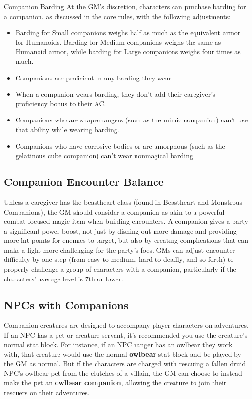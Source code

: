 \documentclass[10pt,a4paper,twoside,bg=print,twocolumn,openany,nodeprecatedcode]{dndbook}
\begin{document}
\begin{DndSidebar}[float=!b]{Companion Barding}
At the GM's discretion, characters can purchase barding for a companion, as discussed in the core rules, with the following adjustments:




\begin{itemize}
\item Barding for Small companions weighs half as much as the equivalent armor for Humanoids. Barding for Medium companions weighs the same as Humanoid armor, while barding for Large companions weighs four times as much.
\item Companions are proficient in any barding they wear.
\item When a companion wears barding, they don't add their caregiver's proficiency bonus to their AC.
\item Companions who are shapechangers (such as the mimic companion) can't use that ability while wearing barding.
\item Companions who have corrosive bodies or are amorphous (such as the gelatinous cube companion) can't wear nonmagical barding.
\end{itemize}



\end{DndSidebar}

\subsection{Companion Encounter Balance}
Unless a caregiver has the beastheart class (found in Beastheart and Monstrous Companions), the GM should consider a companion as akin to a powerful combat-focused magic item when building encounters. A companion gives a party a significant power boost, not just by dishing out more damage and providing more hit points for enemies to target, but also by creating complications that can make a fight more challenging for the party's foes. GMs can adjust encounter difficulty by one step (from easy to medium, hard to deadly, and so forth) to properly challenge a group of characters with a companion, particularly if the characters' average level is 7th or lower.

\subsection{NPCs with Companions}
Companion creatures are designed to accompany player characters on adventures. If an NPC has a pet or creature servant, it's recommended you use the creature's normal stat block. For instance, if an NPC ranger has an owlbear they work with, that creature would use the normal \textbf{owlbear} stat block and be played by the GM as normal. But if the characters are charged with rescuing a fallen druid NPC's owlbear pet from the clutches of a villain, the GM can choose to instead make the pet an \textbf{owlbear companion}, allowing the creature to join their rescuers on their adventures.
\end{document}
